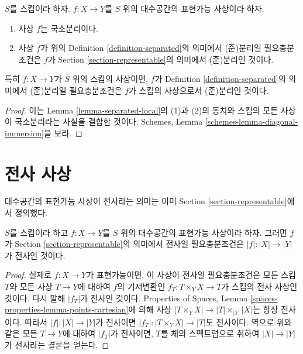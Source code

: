 \begin{lemma}
\label{lemma-match-separated}
$S$를 스킴이라 하자.
$f : X \to Y$를 $S$ 위의 대수공간의 표현가능 사상이라 하자.
\begin{enumerate}
\item 사상 $f$는 국소분리이다.
\item 사상 $f$가 위의 Definition \ref{definition-separated}의
의미에서 (준)분리일 필요충분조건은 $f$가
Section \ref{section-representable}의 의미에서 (준)분리인 것이다.
\end{enumerate}
특히 $f : X \to Y$가 $S$ 위의 스킴의 사상이면,
$f$가 Definition \ref{definition-separated}의 의미에서 (준)분리일
필요충분조건은 $f$가 스킴의 사상으로서 (준)분리인 것이다.
\end{lemma}

\begin{proof}
이는 Lemma \ref{lemma-separated-local}의 (1)과 (2)의 동치와
스킴의 모든 사상이 국소분리라는 사실을 결합한 것이다.
Schemes, Lemma \ref{schemes-lemma-diagonal-immersion}을 보라.
\end{proof}











\section{전사 사상}
\label{section-surjective}

\noindent
대수공간의 표현가능 사상이 전사라는 의미는 이미
Section \ref{section-representable}에서 정의했다.

\begin{lemma}
\label{lemma-surjective-representable}
$S$를 스킴이라 하고 $f : X \to Y$를 $S$ 위의 대수공간의
표현가능 사상이라 하자. 그러면 $f$가
Section \ref{section-representable}의 의미에서 전사일 필요충분조건은
$|f| : |X| \to |Y|$가 전사인 것이다.
\end{lemma}

\begin{proof}
실제로 $f : X \to Y$가 표현가능이면, 이 사상이 전사일 필요충분조건은
모든 스킴 $T$와 모든 사상 $T \to Y$에 대하여 $f$의 기저변환인
$f_T : T \times_Y X \to T$가 스킴의 전사 사상인 것이다.
다시 말해 $|f_T|$가 전사인 것이다. Properties of Spaces, Lemma
\ref{spaces-properties-lemma-points-cartesian}에 의해 사상
$|T \times_Y X| \to |T| \times_{|Y|} |X|$는 항상 전사이다.
따라서 $|f| : |X| \to |Y|$가 전사이면
$|f_T| : |T \times_Y X| \to |T|$도 전사이다.
역으로 위와 같은 모든 $T \to Y$에 대하여 $|f_T|$가 전사이면,
$T$를 체의 스펙트럼으로 취하여 $|X| \to |Y|$가 전사라는 결론을 얻는다.
\end{proof}

